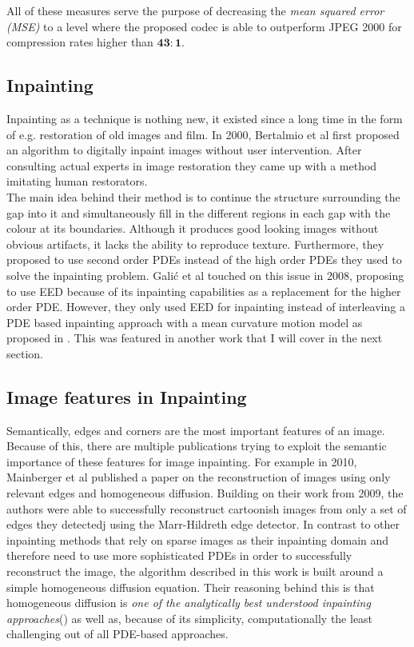     All of these measures serve the purpose of decreasing the \textit{mean squared error (MSE)} to a
level where the proposed codec is able to outperform JPEG 2000 for compression rates higher than
$\mathbf{43:1}$.

\subsection{Inpainting}

Inpainting as a technique is nothing new, it existed since a long time in the form of e.g.
restoration of old images and film. In 2000, Bertalmio et al first proposed an algorithm to digitally
inpaint images without user intervention. After consulting actual experts in image restoration they
came up with a method imitating human restorators.\\
The main idea behind their method is to continue the structure
surrounding the gap into it and simultaneously fill in the different regions in each gap with the colour at its
boundaries\cite{bertalmio00}.
Although it produces good looking images without obvious artifacts, it lacks the ability to
reproduce texture. Furthermore, they proposed to use second order PDEs instead of the high order
PDEs they used to solve the inpainting problem. Galić et al touched on this issue in 2008,
proposing to use EED because of its inpainting capabilities as a replacement for the higher order
PDE\cite{galic08}.
However, they only used EED for inpainting instead of interleaving a PDE based inpainting approach
with a mean curvature motion model as proposed in \cite{bertalmio00}. This was featured in another
work that I will cover in the next section.

\subsection{Image features in Inpainting}

Semantically, edges and corners are the most important features of an image. Because of this, there
are multiple publications trying to exploit the semantic importance of these features for image
inpainting. For example in 2010, Mainberger et al published a paper on the reconstruction of images
using only relevant edges and homogeneous diffusion. Building on their work from 2009, the authors
were able to successfully reconstruct cartoonish images from only a set of edges they detectedj
using the Marr-Hildreth edge detector\cite{hildreth85}.
In contrast to other inpainting methods that rely on sparse images as their inpainting domain 
and therefore need to use more sophisticated PDEs in order to successfully reconstruct the image, 
the algorithm described in this work is built around a simple homogeneous diffusion equation\cite{mainberger10}. 
Their reasoning behind this is that homogeneous diffusion is \textit{one of the analytically best 
understood inpainting approaches}(\cite{mainberger10}) as well as, because of its simplicity, 
computationally the least challenging out of all PDE-based approaches.

